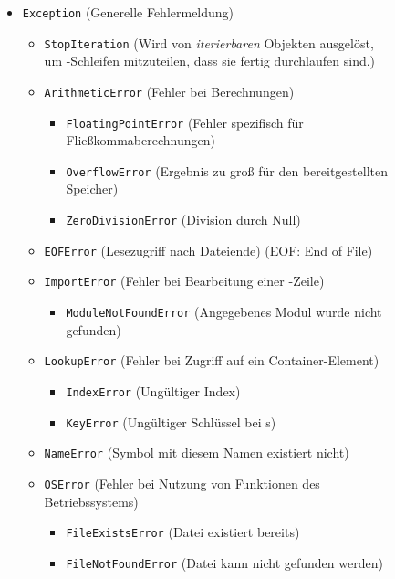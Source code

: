 \begin{figure}
\begin{tcolorbox}[title=Ausgewählte Fehlerklassen]
 \renewcommand{\labelitemi}{\textbullet}
 \renewcommand{\labelitemii}{\textendash}
 \renewcommand{\labelitemiii}{\textperiodcentered}
\begin{itemize}
\item \texttt{Exception} (Generelle Fehlermeldung)
	\begin{itemize}
	\item \texttt{StopIteration} (Wird von \emph{iterierbaren} Objekten ausgelöst, um -Schleifen mitzuteilen, dass sie fertig durchlaufen sind.)
  \item \texttt{ArithmeticError} (Fehler bei Berechnungen)
	  		\begin{itemize}
	  		\item \texttt{FloatingPointError} (Fehler spezifisch für Fließkommaberechnungen)
	    \item \texttt{OverflowError} (Ergebnis zu groß für den bereitgestellten Speicher)
	    \item \texttt{ZeroDivisionError} (Division durch Null)
  			\end{itemize}
    \item \texttt{EOFError} (Lesezugriff nach Dateiende) (EOF: End of File)
    \item \texttt{ImportError} (Fehler bei Bearbeitung einer -Zeile)
    		\begin{itemize}
    		\item \texttt{ModuleNotFoundError} (Angegebenes Modul wurde nicht gefunden)
    		\end{itemize}
    	\item \texttt{LookupError} (Fehler bei Zugriff auf ein Container-Element)
    		\begin{itemize}
    		\item \texttt{IndexError} (Ungültiger Index)
			\item \texttt{KeyError} (Ungültiger Schlüssel bei s)
    		\end{itemize}
		\item \texttt{NameError} (Symbol mit diesem Namen existiert nicht)
		\item \texttt{OSError} (Fehler bei Nutzung von Funktionen des Betriebssystems)
			\begin{itemize}
			\item \texttt{FileExistsError} (Datei existiert bereits)
      \item \texttt{FileNotFoundError} (Datei kann nicht gefunden werden)

\end{itemize}
\end{itemize}
\end{itemize}
\end{tcolorbox}
\end{figure}
